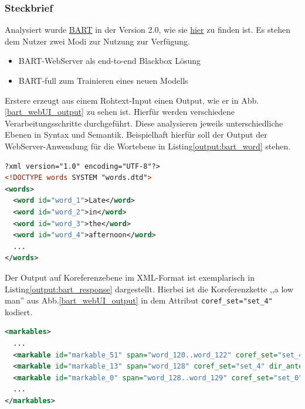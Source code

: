 \subsubsection{Steckbrief}
Analysiert wurde \href{http://www.bart-anaphora.org/}{BART} in der Version 2.0, 
wie sie \href{http://www.bart-anaphora.org/release/bart-2.0.tar.gz}{hier} zu finden 
ist.
Es stehen dem Nutzer zwei Modi zur Nutzung zur Verfügung.
\begin{itemize}
\item BART-WebServer als end-to-end Blackbox Lösung
\item BART-full zum Trainieren eines neuen Modells
\end{itemize}
Erstere erzeugt aus einem Rohtext-Input einen Output, 
wie er in Abb.\ref{bart_webUI_output} zu sehen ist.
Hierfür werden verschiedene Verarbeitungsschritte durchgeführt. 
Diese analysieren jeweils unterschiedliche Ebenen in Syntax und Semantik. 
Beispielhaft hierfür soll der Output der WebServer-Anwendung für die Wortebene in 
Listing\ref{output:bart_word} stehen.

\begin{lstlisting}[label=output:bart_word, name=words.xml, language=xml, caption=BART-Output der Wortebene]
?xml version="1.0" encoding="UTF-8"?>
<!DOCTYPE words SYSTEM "words.dtd">
<words>
  <word id="word_1">Late</word>
  <word id="word_2">in</word>
  <word id="word_3">the</word>
  <word id="word_4">afternoon</word>
  ...
</words>
\end{lstlisting}
Der Output auf Koreferenzebene im XML-Format ist exemplarisch in 
Listing\ref{output:bart_response} dargestellt.
Hierbei ist die Koreferenzkette ,,a low man'' aus Abb.\ref{bart_webUI_output} in dem 
Attribut \lstinline[language=XML]{coref_set="set_4"} kodiert.

\begin{lstlisting}[label=output:bart_response, name=XXX_response_level.xml, language=xml, caption=BART-Output der Koreferenzebene]
<markables>
  ...
  <markable id="markable_51" span="word_120..word_122" coref_set="set_4" min_ids="word_120..word_122" mmax_level="response"/>
  <markable id="markable_13" span="word_128" coref_set="set_4" dir_antecedent="markable_51" mmax_level="response"/>
  <markable id="markable_0" span="word_128..word_129" coref_set="set_0" min_ids="word_128..word_129" mmax_level="response"/>
  ...
</markables>
\end{lstlisting}

